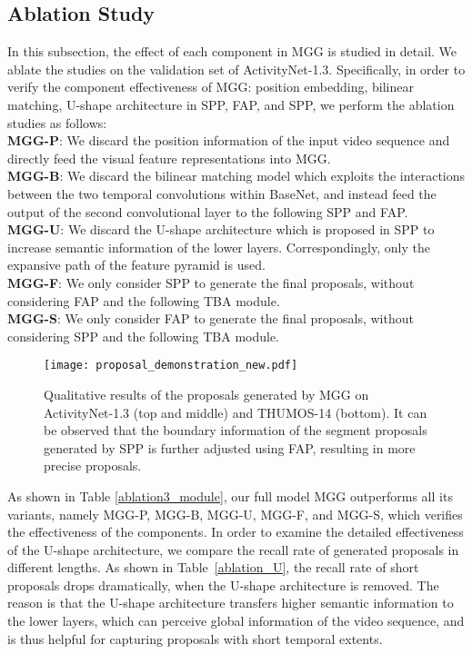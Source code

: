 \documentclass[10pt,twocolumn,letterpaper]{article}
\begin{document}
\subsection{Ablation Study}
In this subsection, the effect of each component in MGG is studied
in detail. We ablate the studies on the validation set of ActivityNet-1.3. Specifically, in order to verify the component effectiveness of MGG: position embedding, bilinear matching,  U-shape architecture in SPP, FAP, and SPP, we perform the ablation studies as follows:\\
   \textbf{MGG-P}: We discard the position information of the input video sequence and  directly feed the visual feature representations into MGG.\\
   \textbf{MGG-B}: We discard the bilinear matching model which exploits the interactions between the two temporal convolutions within BaseNet, and instead feed the output of the second convolutional layer to the following SPP and FAP.\\
  \textbf{MGG-U}: We discard the U-shape architecture which is proposed in SPP to increase semantic information of the lower layers. Correspondingly, only the expansive path of the feature pyramid is used.\\
   \textbf{MGG-F}: We only consider SPP to generate the final proposals, without considering FAP and the following TBA module.\\
   \textbf{MGG-S}: We only consider FAP to generate the final proposals, without considering SPP and the following TBA module.
   
   

\begin{figure}
\centering
\texttt{[image: proposal\_demonstration\_new.pdf]}
\caption{\label{visual}Qualitative results of the proposals generated by MGG
on ActivityNet-1.3 (top and middle) and THUMOS-14 (bottom). It can be observed that the boundary information of the segment proposals 
generated by SPP is further adjusted using FAP, resulting in more precise proposals. }
\label{fig:architecure of network}
\end{figure}


As shown in Table \ref{ablation3_module}, our full model MGG outperforms all its variants, namely MGG-P, MGG-B, MGG-U, MGG-F, and MGG-S, which verifies the effectiveness of the components. In order to examine the detailed effectiveness of the U-shape architecture, we compare the recall rate of generated proposals in different lengths. As shown in Table~\ref{ablation_U}, the recall rate of short proposals drops dramatically, when the U-shape architecture is removed. The reason is that the U-shape architecture transfers higher semantic information to the lower layers, which can perceive global information of the video sequence, and is thus helpful for capturing proposals with short temporal extents.
\end{document}
